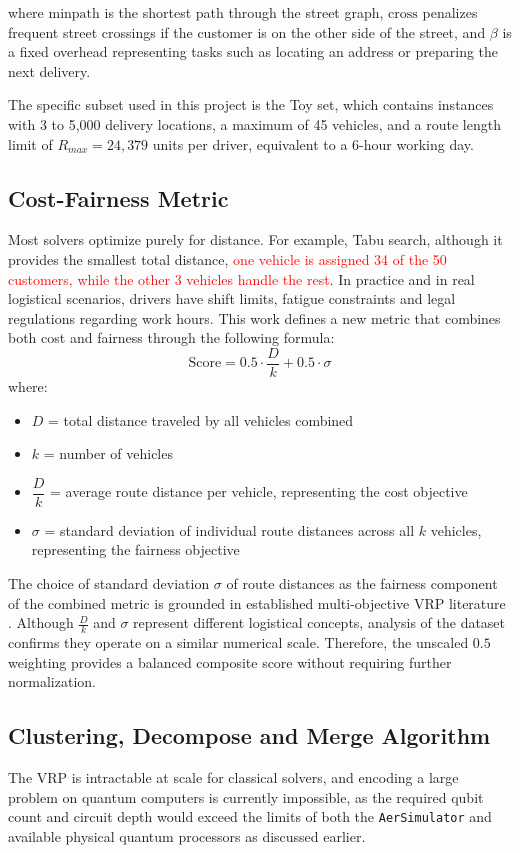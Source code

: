 \documentclass[a4paper]{report}
\begin{document}
{\begin{itemize}
where $\text{minpath}$ is the shortest path through the street graph, 
$\text{cross}$ penalizes frequent street crossings if the customer is on the other side of the street, and $\beta$ is a fixed 
overhead representing tasks such as locating an address or preparing the next delivery.
\newline

The specific subset used in this project is the Toy set, which contains 
instances with 3 to 5{,}000 delivery locations, a maximum of 45 vehicles, 
and a route length limit of $R_{max} = 24{,}379$ units per driver, 
equivalent to a 6-hour working day. 

\subsection{Cost-Fairness Metric}
Most solvers optimize purely for distance. For example, Tabu search, although it provides the smallest total distance, \textcolor{red}{one vehicle is assigned 34 of the 50 customers, while the other 3 vehicles handle the rest}. In practice and in real logistical scenarios, drivers have shift limits, fatigue constraints and legal regulations regarding work hours\cite{driverFairness}.
This work defines a new metric that combines both cost and fairness through the following formula: 
\[
\text{Score} = 0.5 \cdot \frac{D}{k} + 0.5 \cdot \sigma
\]
where: 
\begin{itemize}
    \item $D$ = total distance traveled by all vehicles combined
    \item $k$ = number of vehicles 
    \item $\dfrac{D}{k}$ = average route distance per vehicle, representing the cost objective
    \item $\sigma$ = standard deviation of individual route distances across all $k$ vehicles, representing the fairness objective
\end{itemize}
The choice of standard deviation $\sigma$ of route distances as the fairness component of the combined metric is grounded in established multi-objective VRP literature \cite{standardDev,sobhanan2024equity,bhadoriya2024equitable}. Although $\frac{D}{k}$ and $\sigma$ represent different logistical concepts,  analysis of the dataset confirms they operate on a similar numerical scale. Therefore, the unscaled $0.5$ weighting provides a balanced composite score without requiring further normalization.


\subsection{Clustering, Decompose and Merge Algorithm}
The VRP is intractable at scale for classical solvers, and encoding a large problem on quantum computers is currently impossible, as the required qubit count and circuit depth would exceed the limits of both the \texttt{AerSimulator} and available physical quantum processors as discussed earlier. 


\end{itemize}}
\end{document}
